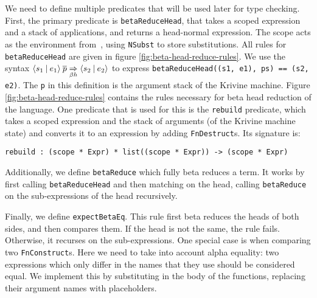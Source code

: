 We need to define multiple predicates that will be used later for type checking. First, the primary predicate is \verb|betaReduceHead|, that takes a scoped expression and a stack of applications, and returns a head-normal expression. The scope acts as the environment from~\cite{krivine}, using \verb|NSubst| to store substitutions. All rules for \verb|betaReduceHead| are given in figure \ref{fig:beta-head-reduce-rules}. We use the syntax $\langle s_1 \: | \: e_1\rangle \: \overline{p} \underset{\beta h}{\Rightarrow} \langle s_2 \: | \: e_2\rangle$ to express \verb|betaReduceHead((s1, e1), ps) == (s2, e2)|. The \verb|p| in this definition is the argument stack of the Krivine machine. Figure \ref{fig:beta-head-reduce-rules} contains the rules necessary for beta head reduction of the language. One predicate that is used for this is the \verb|rebuild| predicate, which takes a scoped expression and the stack of arguments (of the Krivine machine state) and converts it to an expression by adding \verb|FnDestruct|s. Its signature is:
\begin{lstlisting}
rebuild : (scope * Expr) * list((scope * Expr)) -> (scope * Expr)
\end{lstlisting}

Additionally, we define \verb|betaReduce| which fully beta reduces a term. It works by first calling \verb|betaReduceHead| and then matching on the head, calling \verb|betaReduce| on the sub-expressions of the head recursively.

Finally, we define \verb|expectBetaEq|. This rule first beta reduces the heads of both sides, and then compares them. If the head is not the same, the rule fails. Otherwise, it recurses on the sub-expressions. One special case is when comparing two \verb|FnConstruct|s. Here we need to take into account alpha equality: two expressions which only differ in the names that they use should be considered equal. We implement this by substituting in the body of the functions, replacing their argument names with placeholders.



